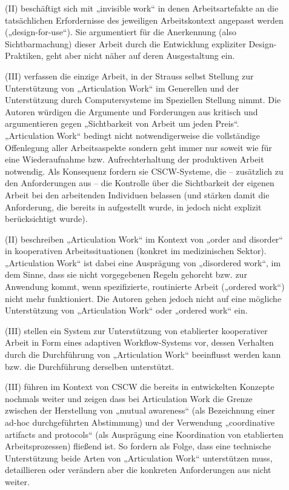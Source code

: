 \begin{description}
	\item[\citet{Suchman99}] (II) beschäftigt sich mit „invisible work“ in denen Arbeitsartefakte an die tatsächlichen Erfordernisse des jeweiligen Arbeitskontext angepasst werden („design-for-use“). Sie argumentiert für die Anerkennung (also Sichtbarmachung) dieser Arbeit durch die Entwicklung expliziter Design-Praktiken, geht aber nicht näher auf deren Ausgestaltung ein.
	\item[\citet{Star99}] (III) verfassen die einzige Arbeit, in der Strauss selbst Stellung zur Unterstützung von „Articulation Work“ im Generellen und der Unterstützung durch Computersysteme im Speziellen Stellung nimmt. Die Autoren  würdigen die Argumente und Forderungen aus \citep{Schmidt96} kritisch und argumentieren gegen „Sichtbarkeit von Arbeit um jeden Preis“. „Articulation Work“ bedingt nicht notwendigerweise die vollständige Offenlegung aller Arbeitsaspekte sondern geht immer nur soweit wie für eine Wiederaufnahme bzw. Aufrechterhaltung der produktiven Arbeit notwendig. Als Konsequenz fordern sie \gls{CSCW}-Systeme, die -- zusätzlich zu den Anforderungen aus \citep{Schmidt96} -- die Kontrolle über die Sichtbarkeit der eigenen Arbeit bei den arbeitenden Individuen belassen (und stärken damit die Anforderung, die bereits in \citep{Schmidt92} aufgestellt wurde, in \citep{Schmidt96} jedoch nicht explizit berücksichtigt wurde).
	\item[\citet{Berg00}] (II) beschreiben „Articulation Work“ im Kontext von „order and disorder“ in kooperativen Arbeitssituationen (konkret im medizinischen Sektor). „Articulation Work“ ist dabei eine Ausprägung von „disordered work“, im dem Sinne, dass sie nicht vorgegebenen Regeln gehorcht bzw. zur Anwendung kommt, wenn spezifizierte, routinierte Arbeit („ordered work“) nicht mehr funktioniert. Die Autoren gehen jedoch nicht auf eine mögliche Unterstützung von „Articulation Work“ oder „ordered work“ ein.
	\item[\citet{Divitini00}] (III) stellen ein System zur Unterstützung von etablierter kooperativer Arbeit in Form eines adaptiven Workflow-Systems vor, dessen Verhalten durch die Durchführung von „Articulation Work“ beeinflusst werden kann bzw. die Durchführung derselben unterstützt.
	\item[\citet{Schmidt00}] (III) führen im Kontext von CSCW die bereits in \citep{Schmidt96} entwickelten Konzepte nochmals weiter und zeigen dass bei Articulation Work die Grenze zwischen der Herstellung von „mutual awareness“ (als Bezeichnung einer ad-hoc durchgeführten Abstimmung) und der Verwendung „coordinative artifacts and protocols“ (als Ausprägung eine Koordination von etablierten Arbeitsprozessen) fließend ist. So fordern als Folge, dass eine technische Unterstützung beide Arten von „Articulation Work“ unterstützen muss, detaillieren oder verändern aber die konkreten Anforderungen aus \citep{Schmidt96} nicht weiter.

\end{description}
